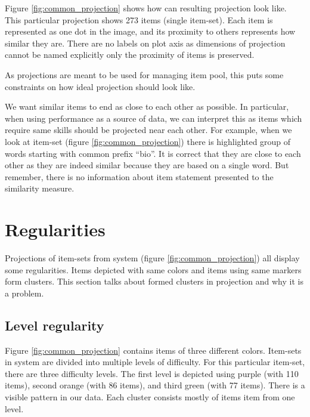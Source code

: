 \documentclass[
  digital, %
  table,   %
  nolof,     %
  nolot,     %
  nocover,
  color,
  final, %
]{fithesis3}
\begin{document}

Figure \ref{fig:common_projection} shows how can resulting projection look like. This particular projection shows 273 items (single item-set). Each item is represented as one dot in the image, and its proximity to others represents how similar they are. There are no labels on plot axis as dimensions of projection cannot be named explicitly only the proximity of items is preserved.


As projections are meant to be used for managing item pool, this puts some constraints on how ideal projection should look like.

We want similar items to end as close to each other as possible. In particular, when using performance as a source of data, we can interpret this as items which require same skills should be projected near each other. For example, when we look at item-set \cviceniB{} (figure \ref{fig:common_projection}) there is highlighted group of words starting with common prefix ``bio''. It is correct that they are close to each other as they are indeed similar because they are based on a single word. But remember, there is no information about item statement presented to the similarity measure.


\section{Regularities}\label{regularities}


Projections of item-sets from system \umimeCesky{} (figure \ref{fig:common_projection}) all display some regularities. Items depicted with same colors and items using same markers form clusters. This section talks about formed clusters in projection and why it is a problem.


\subsection{Level regularity}\label{regularities-level-regularity}


Figure \ref{fig:common_projection} contains items of three different colors. Item-sets in system \umimeCesky{} are divided into multiple levels of difficulty. For this particular item-set, there are three difficulty levels. The first level is depicted using purple (with 110 items), second orange (with 86 items), and third green (with 77 items). There is a  visible pattern in our data. Each cluster consists mostly of items item from one level.
\end{document}
